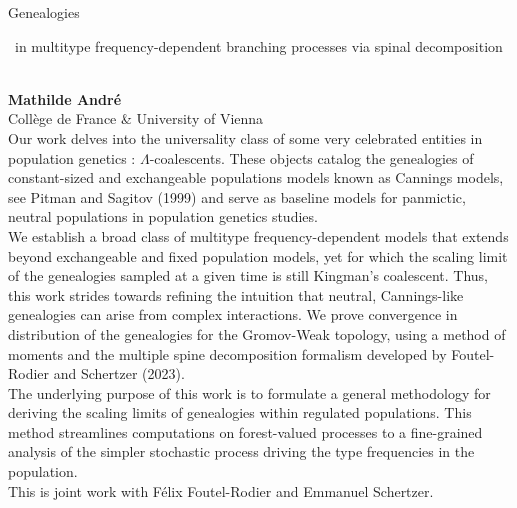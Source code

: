 \documentclass[12pt,a4paper]{article}
\newcommand{\ZAbst}{\rule[-1ex]{0pt}{2ex}\ } %
\begin{document}
\bigskip \bigskip  %

\noindent
{\Large Genealogies\ZAbst in multitype frequency-dependent branching processes via spinal decomposition}\\[1ex]
{\large 
\textbf{Mathilde André}\\[1ex] Collège de France \& University of Vienna}\\[2ex]
Our work delves into the universality class of some very celebrated entities in population genetics : $\Lambda$-coalescents. These objects catalog the genealogies of constant-sized and exchangeable populations models known as Cannings models, see Pitman and Sagitov (1999) and serve as baseline models for panmictic, neutral populations in population genetics studies.
\\
We establish a broad class of multitype frequency-dependent models that extends beyond exchangeable and fixed population models, yet for which the scaling limit of the genealogies sampled at a given time is still Kingman’s coalescent. Thus, this work strides towards refining the intuition that neutral, Cannings-like genealogies can arise from complex interactions.  We prove convergence in distribution of the genealogies for the Gromov-Weak topology, using a method of moments and the multiple spine decomposition formalism developed by Foutel-Rodier and Schertzer (2023).
\\
The underlying purpose of this work is to formulate a general methodology for deriving the scaling limits of genealogies within regulated populations. This method streamlines computations on forest-valued processes to a fine-grained analysis of the simpler stochastic process driving the type frequencies in the population.
\\
This is joint work with Félix Foutel-Rodier and Emmanuel Schertzer.
\end{document}
